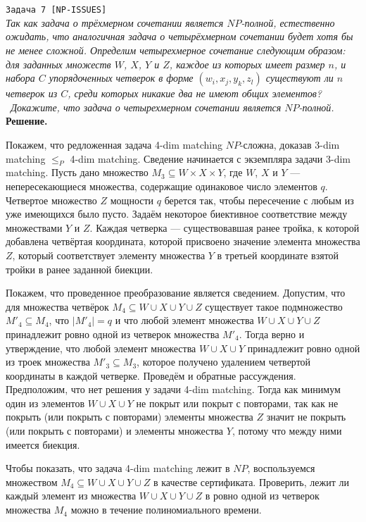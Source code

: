 \documentclass[10pt]{article}
\begin{document}
\ \\[0.5 cm]
\hline
\ \\[0.5 cm]
{\large\texttt{Задача 7 [NP-ISSUES]}}
\ \\[0.1cm]
\textit{
Так как задача о трёхмерном сочетании является $NP$-полной, естественно ожидать, что аналогичная задача о четырёхмерном сочетании будет хотя бы не менее сложной. Определим четырехмерное сочетание следующим образом: для заданных множеств $W$, $X$, $Y$ и $Z$, каждое из которых имеет размер $n$, и набора $C$ упорядоченных четверок в форме $(w_i, x_j, y_k , z_l)$ существуют ли $n$ четверок из $C$, среди которых никакие два не имеют общих элементов?
\\ \
Докажите, что задача о четырехмерном сочетании является $NP$-полной.
}
\ \\[0.3cm]
\textbf{Решение.} 
\medskip\par 
Покажем, что редложенная задача 4-dim matching $NP$-сложна, доказав 3-dim matching $\leq_P$ 4-dim matching. Сведение начинается с экземпляра задачи 3-dim matching. Пусть дано множество  $M_3 \subseteq W\times X\times Y$, где $W$, $X$ и $Y$ --- непересекающиеся множества, содержащие одинаковое число элементов $q$. Четвертое множество $Z$ мощности $q$ берется так, чтобы пересечение с любым из уже имеющихся было пусто. Задаём некоторое биективное соответствие между множествами $Y$ и $Z$. Каждая четверка --- существовавшая ранее тройка, к которой добавлена четвёртая координата, которой присвоено значение элемента множества $Z$, который соответствует элементу множества $Y$ в третьей координате взятой тройки в ранее заданной биекции.
\medskip\par Покажем, что проведенное преобразование является сведением. Допустим, что для множества четвёрок $M_4\subseteq W\cup X\cup Y\cup Z$ существует такое подмножество $M'_4\subseteq M_4$, что $|M'_4|=q$ и что любой элемент множества $W\cup X\cup Y\cup Z$ принадлежит ровно одной из четверок множества $M'_4$. Тогда верно и утверждение, что любой элемент множества $W\cup X\cup Y$ принадлежит ровно одной из троек множества $M'_3\subseteq M_3$, которое получено удалением четвертой координаты в каждой четверке. Проведём и обратные рассуждения. Предположим, что нет решения у задачи 4-dim matching. Тогда как минимум один из элементов $W\cup X\cup Y$ не покрыт или покрыт с повторами, так как не покрыть (или покрыть с повторами) элементы множества $Z$ значит не покрыть (или покрыть с повторами) и элементы множества $Y$, потому что между ними имеется биекция.
\medskip\par Чтобы показать, что задача 4-dim matching лежит в $NP$, воспользуемся множеством $M_4\subseteq W\cup X\cup Y\cup Z$ в качестве сертификата. Проверить, лежит ли каждый элемент из множества $W\cup X\cup Y\cup Z$ в ровно одной из четверок множества $M_4$ можно в течение полиномиального времени.
\end{document}
